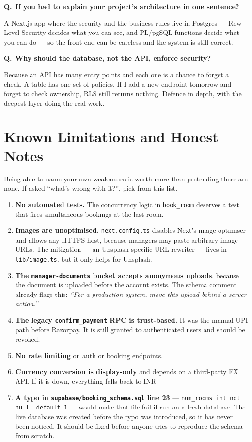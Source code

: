 \documentclass[11pt,a4paper]{article}
\newcommand{\Q}[1]{\vspace{7pt}\noindent\textbf{\color{primary}Q.}~\textbf{#1}\par\vspace{1pt}}
\newcommand{\A}[1]{\noindent #1\par}
\newcommand{\file}[1]{\texttt{\small #1}}
\begin{document}
\Q{If you had to explain your project's architecture in one sentence?}
\A{A Next.js app where the security and the business rules live in Postgres --- Row
Level Security decides what you can see, and PL/pgSQL functions decide what you can
do --- so the front end can be careless and the system is still correct.}

\Q{Why should the database, not the API, enforce security?}
\A{Because an API has many entry points and each one is a chance to forget a check.
A table has one set of policies. If I add a new endpoint tomorrow and forget to
check ownership, RLS still returns nothing. Defence in depth, with the deepest
layer doing the real work.}

\newpage
\section{Known Limitations and Honest Notes}

Being able to name your own weaknesses is worth more than pretending there are
none. If asked ``what's wrong with it?'', pick from this list.

\begin{enumerate}[leftmargin=*]
  \item \textbf{No automated tests.} The concurrency logic in \texttt{book\_room}
        deserves a test that fires simultaneous bookings at the last room.
  \item \textbf{Images are unoptimised.} \texttt{next.config.ts} disables Next's
        image optimiser and allows any HTTPS host, because managers may paste
        arbitrary image URLs. The mitigation --- an Unsplash-specific URL rewriter
        --- lives in \file{lib/image.ts}, but it only helps for Unsplash.
  \item \textbf{The \texttt{manager-documents} bucket accepts anonymous uploads},
        because the document is uploaded before the account exists. The schema
        comment already flags this: \emph{``For a production system, move this
        upload behind a server action.''}
  \item \textbf{The legacy \texttt{confirm\_payment} RPC is trust-based.} It was
        the manual-UPI path before Razorpay. It is still granted to
        authenticated users and should be revoked.
  \item \textbf{No rate limiting} on auth or booking endpoints.
  \item \textbf{Currency conversion is display-only} and depends on a third-party
        FX API. If it is down, everything falls back to INR.
  \item \textbf{A typo in \file{supabase/booking\_schema.sql} line 23}
        --- \texttt{num\_rooms int not nu ll default 1} --- would make that file fail
        if run on a fresh database. The live database was created before the typo
        was introduced, so it has never been noticed. It should be fixed before
        anyone tries to reproduce the schema from scratch.
\end{enumerate}
\end{document}
